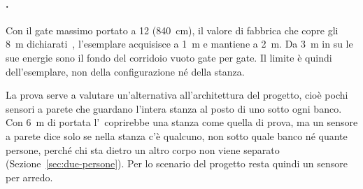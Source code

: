 \paragraph{\ldc.} Con il gate massimo portato a 12 (840~cm), il valore di fabbrica
che copre gli 8~m dichiarati~\cite{hilinkManualLD2420}, l'esemplare acquisisce a 1~m e mantiene a 2~m. Da 3~m in
su le sue energie sono il fondo del corridoio vuoto gate per gate. Il limite è quindi
dell'esemplare, non della configurazione né della stanza.

La prova serve a valutare un'alternativa all'architettura del progetto, cioè pochi sensori a parete che guardano l'intera stanza al posto di uno sotto ogni banco. Con 6~m di portata l'\ldb\ coprirebbe una stanza come quella di prova, ma un sensore a parete dice solo se nella stanza c'è qualcuno, non sotto quale banco né quante persone, perché chi sta dietro un altro corpo non viene separato (Sezione~\ref{sec:due-persone}). Per lo scenario del progetto resta quindi un sensore per arredo.
